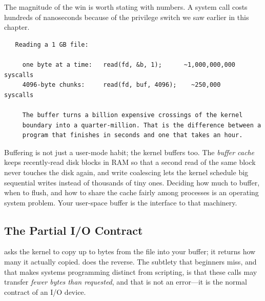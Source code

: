 The magnitude of the win is worth stating with numbers. A system call
costs hundreds of nanoseconds because of the privilege switch we saw
earlier in this chapter.

\begin{verbatim}
   Reading a 1 GB file:

     one byte at a time:   read(fd, &b, 1);      ~1,000,000,000 syscalls
     4096-byte chunks:     read(fd, buf, 4096);    ~250,000      syscalls

     The buffer turns a billion expensive crossings of the kernel
     boundary into a quarter-million. That is the difference between a
     program that finishes in seconds and one that takes an hour.
\end{verbatim}

\begin{osconcept}
Buffering is not just a user-mode habit; the kernel buffers too. The
\emph{buffer cache} keeps recently-read disk blocks in RAM so that a
second read of the same block never touches the disk again, and write
coalescing lets the kernel schedule big sequential writes instead of
thousands of tiny ones. Deciding how much to buffer, when to flush,
and how to share the cache fairly among processes is an operating
system problem. Your user-space buffer is the interface to that
machinery.
\end{osconcept}

\subsection{The Partial I/O Contract}

 asks the kernel to copy up to  bytes
from the file into your buffer; it returns how many it actually copied.
 does the reverse. The subtlety that beginners
miss, and that makes systems programming distinct from scripting, is
that these calls may transfer \emph{fewer bytes than requested}, and
that is not an error---it is the normal contract of an I/O device.


